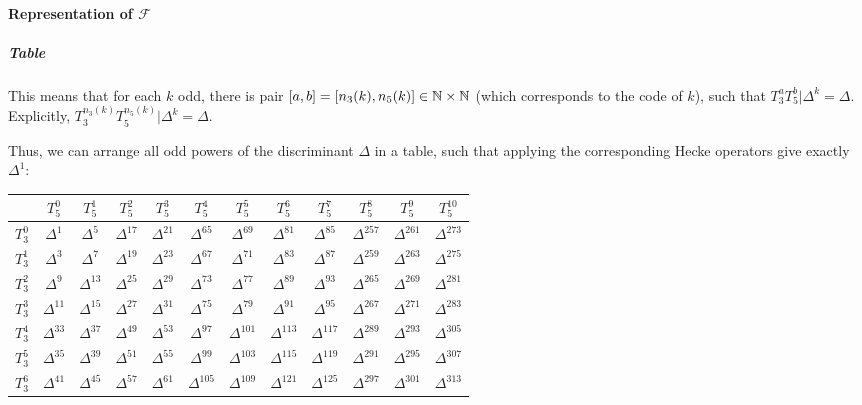 \paragraph{Representation of $\mathcal{F}$}
\subparagraph{Table}
This means that for each $k$ odd, there is pair $\left[ a,b \right] = \left[ n_3(k),n_5(k) \right] \in \mathbb{N}\times\mathbb{N}$ (which corresponds to the code of $k$), such that $T_3^aT_5^b|\Delta^k = \Delta$.
Explicitly, $T_3^{n_3(k)}T_5^{n_5(k)}|\Delta^k = \Delta$.

Thus, we can arrange all odd powers of the discriminant $\Delta$ in a table, such that applying the corresponding Hecke operators give exactly $\Delta^1$:
\begin{center}
	\begin{tabular}{|c||ccccccccccc|}
		\hline
		\textbf{} & \textbf{$T_5^{0}$} & \textbf{$T_5^{1}$} & \textbf{$T_5^{2}$} & \textbf{$T_5^{3}$} & \textbf{$T_5^{4}$} & \textbf{$T_5^{5}$} & \textbf{$T_5^{6}$} & \textbf{$T_5^{7}$} & \textbf{$T_5^{8}$} & \textbf{$T_5^{9}$} & \textbf{$T_5^{10}$} \\
		\hline\hline
		$T_3^{0}$ & $\Delta^{1}$ & $\Delta^{5}$ & $\Delta^{17}$ & $\Delta^{21}$ & $\Delta^{65}$ & $\Delta^{69}$ & $\Delta^{81}$ & $\Delta^{85}$ & $\Delta^{257}$ & $\Delta^{261}$ & $\Delta^{273}$ \\
		$T_3^{1}$ & $\Delta^{3}$ & $\Delta^{7}$ & $\Delta^{19}$ & $\Delta^{23}$ & $\Delta^{67}$ & $\Delta^{71}$ & $\Delta^{83}$ & $\Delta^{87}$ & $\Delta^{259}$ & $\Delta^{263}$ & $\Delta^{275}$ \\
		$T_3^{2}$ & $\Delta^{9}$ & $\Delta^{13}$ & $\Delta^{25}$ & $\Delta^{29}$ & $\Delta^{73}$ & $\Delta^{77}$ & $\Delta^{89}$ & $\Delta^{93}$ & $\Delta^{265}$ & $\Delta^{269}$ & $\Delta^{281}$ \\
		$T_3^{3}$ & $\Delta^{11}$ & $\Delta^{15}$ & $\Delta^{27}$ & $\Delta^{31}$ & $\Delta^{75}$ & $\Delta^{79}$ & $\Delta^{91}$ & $\Delta^{95}$ & $\Delta^{267}$ & $\Delta^{271}$ & $\Delta^{283}$ \\
		$T_3^{4}$ & $\Delta^{33}$ & $\Delta^{37}$ & $\Delta^{49}$ & $\Delta^{53}$ & $\Delta^{97}$ & $\Delta^{101}$ & $\Delta^{113}$ & $\Delta^{117}$ 
		& $\Delta^{289}$ & $\Delta^{293}$ & $\Delta^{305}$ \\
		$T_3^{5}$ & $\Delta^{35}$ & $\Delta^{39}$ & $\Delta^{51}$ & $\Delta^{55}$ & $\Delta^{99}$ & $\Delta^{103}$ & $\Delta^{115}$ & $\Delta^{119}$ 
		& $\Delta^{291}$ & $\Delta^{295}$ & $\Delta^{307}$ \\
		$T_3^{6}$ & $\Delta^{41}$ & $\Delta^{45}$ & $\Delta^{57}$ & $\Delta^{61}$ & $\Delta^{105}$ & $\Delta^{109}$ & $\Delta^{121}$ & $\Delta^{125}$ & $\Delta^{297}$ & $\Delta^{301}$ & $\Delta^{313}$ \\

\end{tabular}
\end{center}
